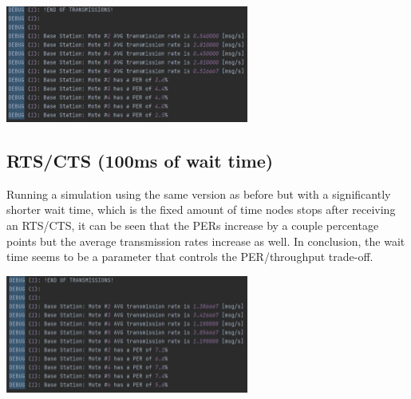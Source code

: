 \documentclass{article}
\begin{document}
\begin{center}
  \includegraphics[width=8cm]{images/RCTS.jpg}
\end{center}

\subsection{RTS/CTS (100ms of wait time)}
Running a simulation using the same version as before but with a significantly shorter wait time, which is the fixed amount of time nodes stops after receiving an RTS/CTS, it can be seen that the PERs increase by a couple percentage points but the average transmission rates increase as well. In conclusion, the wait time seems to be a parameter that controls the PER/throughput trade-off.

\begin{center}
  \includegraphics[width=8cm]{images/RCTS_100.jpg}
\end{center}
\end{document}
